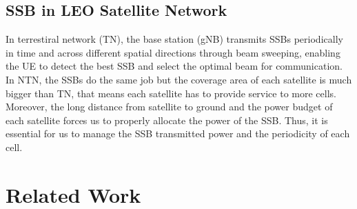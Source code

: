 \subsection{SSB in LEO Satellite Network}
In terrestiral network (TN), the base station (gNB) transmits SSBs periodically in time and across different spatial directions through beam sweeping, enabling the UE to detect the best SSB and select the optimal beam for communication. In NTN, the SSBs do the same job but the coverage area of each satellite is much bigger than TN, that means each satellite has to provide service to more cells. Moreover, the long distance from satellite to ground and the power budget of each satellite forces us to properly allocate the power of the SSB. Thus, it is essential for us to manage the SSB transmitted power and the periodicity of each cell.



\section{Related Work}


